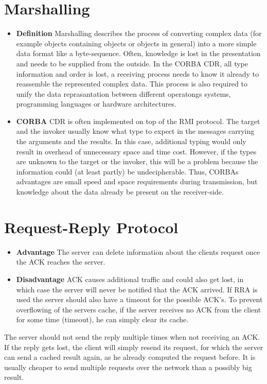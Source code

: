 \documentclass{tudexercise}
\begin{document}
	\section{Marshalling}
		\begin{itemize}
			\item \textbf{Definition} Marshalling describes the process of converting complex data (for example objects containing objects or objects in general) into a more simple data format like a byte-sequence. Often, knowledge is lost in the presentation and needs to be supplied from the outside. In the CORBA CDR, all type information and order is lost, a receiving process needs to know it already to reassemble the represented complex data. This process is also required to unify the data reprasantation between different operatongs systems, programming languages or hardware architectures.
			\item \textbf{CORBA} CDR is often implemented on top of the RMI protocol. The target and the invoker usually know what type to expect in the messages carrying the arguments and the results. In this case, additional typing would only result in overhead of unnecessary space and time cost. However, if the types are unknown to the target or the invoker, this will be a problem because the information could (at least partly) be undecipherable. Thus, CORBAs advantages are small speed and space requirements during transmission, but knowledge about the data already be present on the receiver-side.
		\end{itemize}
		
	\section{Request-Reply Protocol}
		\begin{itemize}
			\item \textbf{Advantage} The server can delete information about the clients request once the ACK reaches the server.
			\item \textbf{Disadvantage} ACK causes additional traffic and could also get lost, in which case the server will never be notified that the ACK arrived. If RRA is used the server should also have a timeout for the possible ACK's. To prevent overflowing of the servers cache, if the server receives no ACK from the client for some time (timeout), he can simply clear its cache.
		\end{itemize}
		The server should not send the reply multiple times when not receiving an ACK. If the reply gets lost, the client will simply resend its request, for which the server can send a cached result again, as he already computed the request before. It is usually cheaper to send multiple requests over the network than a possibly big result.
\end{document}
